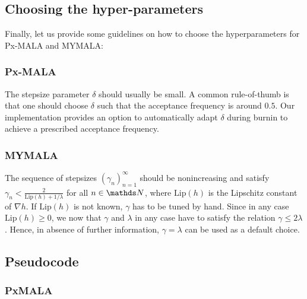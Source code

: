 \documentclass[10pt]{article}
\numberwithin{equation}{section}
\begin{document}
\subsection{Choosing the hyper-parameters}

Finally, let us provide some guidelines on how to choose the hyperparameters for Px-MALA and MYMALA:

\subsubsection*{Px-MALA}

The stepsize parameter $\delta$ should usually be small. A common rule-of-thumb is that one should choose $\delta$ such that the acceptance frequency is around $0.5$. Our implementation provides an option to automatically adapt $\delta$ during burnin to achieve a prescribed acceptance frequency.

\subsubsection*{MYMALA}

The sequence of stepsizes $(\gamma_n)_{n=1}^\infty$ should be nonincreasing and satisfy $\gamma_n < \frac{2}{\mathrm{Lip}(h) + 1/\lambda}$ for all $n \in \N$, where $\mathrm{Lip}(h)$ is the Lipschitz constant of $\nabla h$. If $\mathrm{Lip}(h)$ is not known, $\gamma$ has to be tuned by hand. Since in any case $\mathrm{Lip}(h) \geq 0$, we now that $\gamma$ and $\lambda$ in any case have to satisfy the relation $\gamma \leq 2 \lambda$. Hence, in absence of further information, $\gamma = \lambda$ can be used as a default choice.

\subsection{Pseudocode}

\subsubsection*{PxMALA}
\end{document}
